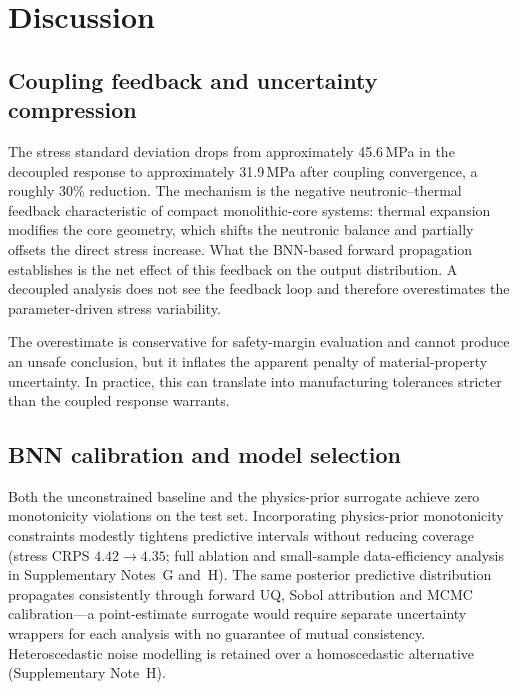 \documentclass[11pt,a4paper]{article}
\begin{document}
\section{Discussion}

\subsection{Coupling feedback and uncertainty compression}

The stress standard deviation drops from approximately 45.6\,MPa in the
decoupled response to approximately 31.9\,MPa after coupling
convergence, a roughly 30\% reduction. The mechanism is the negative
neutronic--thermal feedback characteristic of compact monolithic-core
systems: thermal expansion modifies the core geometry, which shifts the
neutronic balance and partially offsets the direct stress increase. What
the BNN-based forward propagation establishes is the net effect of this
feedback on the output distribution. A decoupled analysis does not see
the feedback loop and therefore overestimates the parameter-driven stress
variability.

The overestimate is conservative for safety-margin evaluation and cannot
produce an unsafe conclusion, but it inflates the apparent penalty of
material-property uncertainty. In practice, this can translate into
manufacturing tolerances stricter than the coupled response warrants.

\subsection{BNN calibration and model selection}

Both the unconstrained baseline and the physics-prior surrogate achieve
zero monotonicity violations on the test set. Incorporating
physics-prior monotonicity constraints modestly tightens predictive
intervals without reducing coverage (stress CRPS $4.42 \to 4.35$;
full ablation and small-sample data-efficiency analysis in
Supplementary Notes~G and~H). The same posterior predictive
distribution propagates consistently through forward UQ, Sobol
attribution and MCMC calibration---a point-estimate surrogate would
require separate uncertainty wrappers for each analysis with no
guarantee of mutual consistency. Heteroscedastic noise modelling is
retained over a homoscedastic alternative (Supplementary Note~H).
\end{document}

